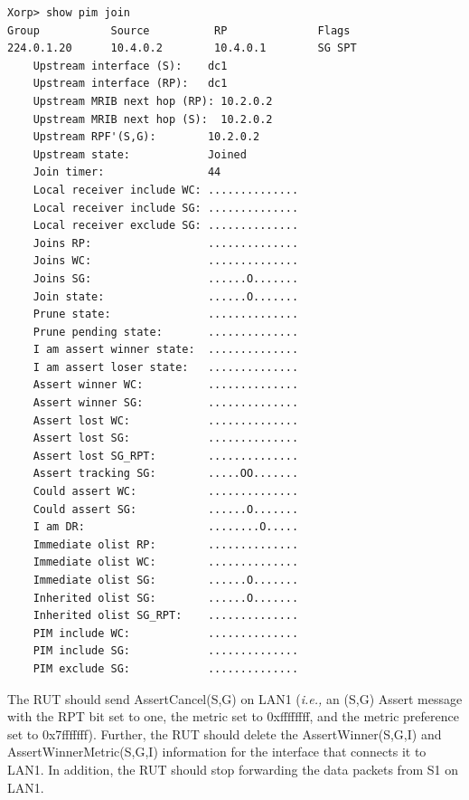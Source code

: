 \documentclass[11pt]{report}
\newcommand{\ie}{\emph{i.e.,}\xspace}
\begin{document}
\begin{itemize}
\begin{verbatim}
Xorp> show pim join 
Group           Source          RP              Flags
224.0.1.20      10.4.0.2        10.4.0.1        SG SPT 
    Upstream interface (S):    dc1
    Upstream interface (RP):   dc1
    Upstream MRIB next hop (RP): 10.2.0.2
    Upstream MRIB next hop (S):  10.2.0.2
    Upstream RPF'(S,G):        10.2.0.2
    Upstream state:            Joined 
    Join timer:                44
    Local receiver include WC: ..............
    Local receiver include SG: ..............
    Local receiver exclude SG: ..............
    Joins RP:                  ..............
    Joins WC:                  ..............
    Joins SG:                  ......O.......
    Join state:                ......O.......
    Prune state:               ..............
    Prune pending state:       ..............
    I am assert winner state:  ..............
    I am assert loser state:   ..............
    Assert winner WC:          ..............
    Assert winner SG:          ..............
    Assert lost WC:            ..............
    Assert lost SG:            ..............
    Assert lost SG_RPT:        ..............
    Assert tracking SG:        .....OO.......
    Could assert WC:           ..............
    Could assert SG:           ......O.......
    I am DR:                   ........O.....
    Immediate olist RP:        ..............
    Immediate olist WC:        ..............
    Immediate olist SG:        ......O.......
    Inherited olist SG:        ......O.......
    Inherited olist SG_RPT:    ..............
    PIM include WC:            ..............
    PIM include SG:            ..............
    PIM exclude SG:            ..............
\end{verbatim}

  The RUT should send AssertCancel(S,G) on LAN1 (\ie an (S,G) Assert message
  with the RPT bit set to one, the metric set to 0xffffffff, and the
  metric preference set to 0x7fffffff).
  Further, the RUT should delete the AssertWinner(S,G,I) and
  AssertWinnerMetric(S,G,I) information for the interface that connects it to
  LAN1.
  In addition, the RUT should stop forwarding the data packets from S1 on LAN1.

\end{itemize}

\end{document}
